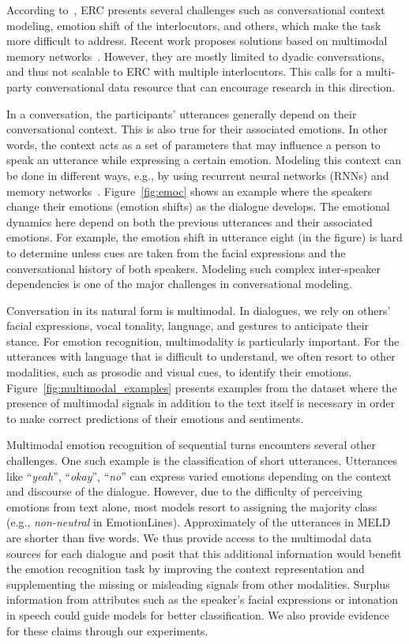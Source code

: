 \documentclass[11pt,a4paper]{article}
\begin{document}
According to~\citet{poria2019emotion}, ERC presents several challenges such as conversational context modeling, emotion shift of the interlocutors, and others, which make the task more difficult to address. Recent work proposes solutions based on multimodal memory networks~\cite{hazarika2018conversational}. However, they are mostly limited to dyadic conversations, and thus not scalable to ERC with multiple interlocutors. This calls for a multi-party conversational data resource that can encourage research in this direction.


In a conversation, the participants' utterances generally depend on their conversational context. This is also true for their associated emotions. In other words, the context acts as a set of parameters that may influence a person to speak an utterance while expressing a certain emotion. Modeling this context can be done in different ways, e.g., by using recurrent neural networks (RNNs) and memory networks~\cite{hazarika2018conversational,porcon,serban2017hierarchical}. Figure~\ref{fig:emoc} shows an example where the speakers change their emotions (emotion shifts) as the dialogue develops. The emotional dynamics here depend on both the previous utterances and their associated emotions. For example, the emotion shift in utterance eight (in the figure) is hard to determine unless cues are taken from the facial expressions and the conversational history of both  speakers. Modeling such complex inter-speaker dependencies is one of the major challenges in conversational modeling.

Conversation in its natural form is multimodal. In dialogues, we rely on others' facial expressions, vocal tonality, language, and gestures to anticipate their stance. For emotion recognition, multimodality is particularly important. For the utterances with language that is difficult to understand, we often resort to other modalities, such as prosodic and visual cues, to identify their emotions. Figure~\ref{fig:multimodal_examples} presents examples from the dataset where the presence of multimodal signals in addition to the text itself is necessary in order to make correct predictions of their emotions and sentiments.


Multimodal emotion recognition of sequential turns encounters several other challenges. One such example is the classification of short utterances. Utterances like ``\textit{yeah}'', ``\textit{okay}'', ``\textit{no}'' can express varied emotions depending on the context and discourse of the dialogue. However, due to the difficulty of perceiving emotions from text alone, most models resort to assigning the majority class (e.g., \textit{non-neutral} in EmotionLines). Approximately  of the utterances in MELD are shorter than five words. We thus provide access to the multimodal data sources for each dialogue and posit that this additional information would benefit the emotion recognition task by improving the context representation and supplementing the missing or misleading signals from other modalities. Surplus information from attributes such as the speaker's facial expressions or intonation in speech could guide models for better classification. We also provide evidence for these claims through our experiments.
\end{document}
